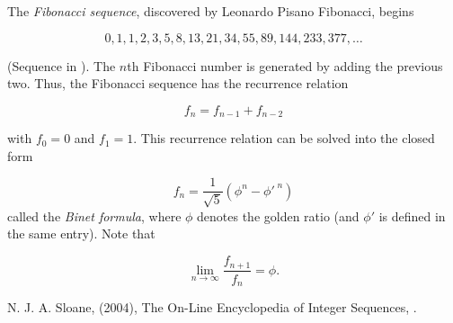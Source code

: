 \documentclass{article}
\begin{document}
The \emph{Fibonacci sequence}, discovered by Leonardo Pisano Fibonacci, begins

$$ 0, 1, 1, 2, 3, 5 ,8 , 13, 21, 34, 55, 89, 144, 233, 377, \ldots $$

(Sequence  in \cite{OEIS}).
The $n$th Fibonacci number is generated by adding the previous two.  Thus, the Fibonacci sequence has the recurrence relation 

$$ f_n = f_{n-1} + f_{n-2} $$

with $f_0=0$ and $f_1 = 1$.  This recurrence relation can be solved into the closed form 

$$ f_n = \frac{1}{\sqrt{5}} \left( \phi^n - \phi'^{\;n} \right) $$
called the \emph{Binet formula}, where $\phi$ denotes the golden ratio (and $\phi'$ is defined in the same entry). Note that

$$ \lim_{n\rightarrow \infty} \frac{f_{n+1}}{f_n}   = \phi. $$

\begin{thebibliography}{15} 
N. J. A. Sloane, (2004), The On-Line Encyclopedia of Integer Sequences, .
\end{thebibliography}
\end{document}
